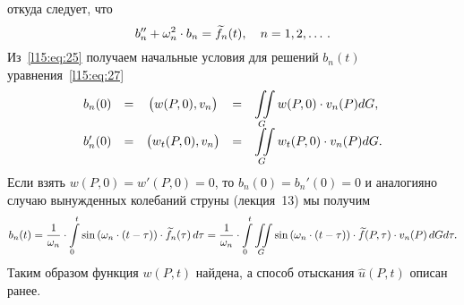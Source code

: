 \documentclass[12pt,a4paper,openany,fleqn]{book}
\theoremstyle{definition}
\begin{document}
	откуда следует, что 
	\begin{equation}\label{l15:eq:27}
		\hfill b_n''+\omega_n^2\cdot b_n=\widetilde{f}_n(t),\quad n=1,2,\ldots\,.\hfill
	\end{equation}
	Из~\eqref{l15:eq:25} получаем начальные условия для решений $b_n(t)$ уравнения~\eqref{l15:eq:27}
	\begin{equation*}
		\hfill\begin{array}{rcccl}
			 b_n(0)&=&\big(w(P,0),v_n\big)&=&\displaystyle\iint\limits_{G}w(P,0)\cdot v_n(P)dG,\\
			 b'_n(0)&=&\big(w_t(P,0),v_n\big)&=&\displaystyle\iint\limits_{G}w_t(P,0)\cdot v_n(P)dG.
		\end{array}\hfill
	\end{equation*}
	Если взять $w(P,0)=w'(P,0)=0$, то $b_n(0)=b_n'(0)=0$ и аналогияно случаю вынужденных колебаний струны (лекция~13) мы получим 
	\begin{equation*}
		\hfill b_n(t)=\frac{1}{\omega_n}\cdot\int\limits_0^t\sin\left(\omega_n\cdot(t-\tau)\right)\cdot\widetilde{f}_n(\tau)\,d\tau=\frac{1}{\omega_n}\cdot\int\limits_0^t\iint\limits_{G}\sin\left(\omega_n\cdot(t-\tau)\right)\cdot\widetilde{f}(P,\tau)\cdot v_n(P)\,dGd\tau.\hfill
	\end{equation*}
	Таким образом функция $w(P,t)$ найдена, а способ отыскания $\widehat{u}(P,t)$ описан ранее.
	
\end{document}
